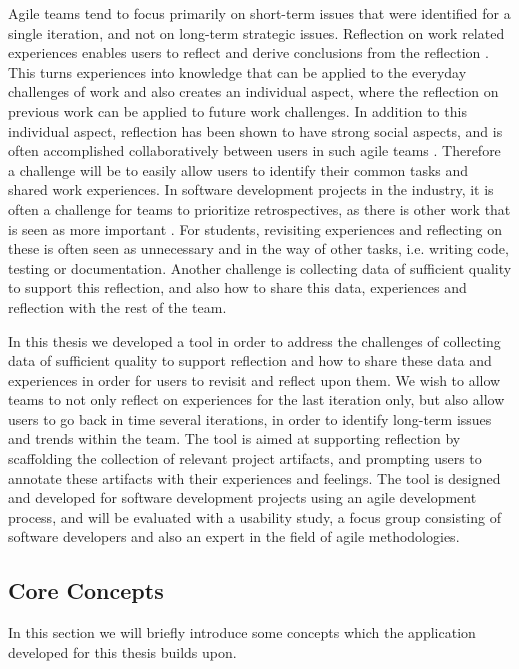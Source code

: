 Agile teams tend to focus primarily on short-term issues that were identified for a single iteration, and not on long-term strategic issues\citep{Drury2011}. Reflection on work related experiences enables users to reflect and derive conclusions from the reflection \citep{Korthagen_Vasalos_2005}. This turns experiences into knowledge that can be applied to the everyday challenges of work and also creates an individual aspect, where the reflection on previous work can be applied to future work challenges. In addition to this individual aspect, reflection has been shown to have strong social aspects, and is often accomplished collaboratively between users in such agile teams \citep{Hoeyrup_2004}. Therefore a challenge will be to easily allow users to identify their common tasks and shared work experiences. In software development projects in the industry, it is often a challenge for teams to prioritize retrospectives, as there is other work that is seen as more important \citep{kasi2008post}. For students, revisiting experiences and reflecting on these is often seen as unnecessary and in the way of other tasks, i.e. writing code, testing or documentation. Another challenge is collecting data of sufficient quality to support this reflection, and also how to share this data, experiences and reflection with the rest of the team.  

In this thesis we developed a tool in order to address the challenges of collecting data of sufficient quality to support reflection and how to share these data and experiences in order for users to revisit and reflect upon them. We wish to allow teams to not only reflect on experiences for the last iteration only, but also allow users to go back in time several iterations, in order to identify long-term issues and trends within the team. The tool is aimed at supporting reflection by scaffolding the collection of relevant project artifacts, and prompting users to annotate these artifacts with their experiences and feelings. The tool is designed and developed for software development projects using an agile development process, and will be evaluated with a usability study, a focus group consisting of software developers and also an expert in the field of agile methodologies. 

\subsection{Core Concepts}
In this section we will briefly introduce some concepts which the application developed for this thesis builds upon.
